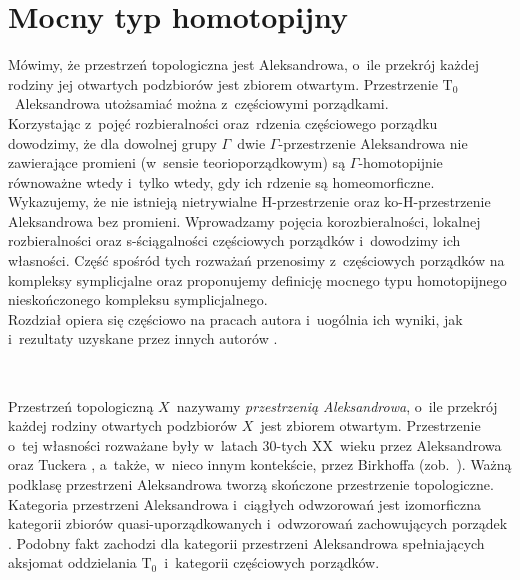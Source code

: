\chapter{Mocny typ homotopijny}\label{chapter2}
\begin{center}
\begin{minipage}{14cm}
{\small
Mówimy, że przestrzeń topologiczna jest Aleksandrowa, o~ile przekrój każdej rodziny jej otwartych podzbiorów jest zbiorem otwartym. Przestrzenie $\mathrm{T_0}$~Aleksandrowa utożsamiać można z~częściowymi porządkami. \\

Korzystając z~pojęć rozbieralności oraz~rdzenia częściowego porządku dowodzimy, że dla dowolnej grupy $\Gamma$~dwie $\Gamma$-przestrzenie Aleksandrowa nie zawierające promieni (w~sensie teorioporządkowym) są $\Gamma$-homotopijnie równoważne wtedy i~tylko wtedy, gdy ich rdzenie są homeomorficzne.  Wykazujemy, że  nie istnieją nietrywialne H-przestrzenie oraz ko-H-przestrzenie Aleksandrowa bez promieni. Wprowadzamy pojęcia korozbieralności, lokalnej rozbieralności oraz s-ściągalności częściowych porządków i~dowodzimy ich własności. Część spośród tych rozważań przenosimy z~częściowych porządków na kompleksy symplicjalne oraz proponujemy definicję mocnego typu homotopijnego nieskończonego kompleksu symplicjalnego.\\

Rozdział opiera się częściowo na pracach autora \cite{Kukiela10a,Kukiela10} i~uogólnia ich wyniki, jak i~rezultaty uzyskane przez innych autorów \cite{Barmak12,Stong66,Stong84}.
}\end{minipage}\\[1.7cm]
\end{center}

Przestrzeń topologiczną $X$~nazywamy \textit{przestrzenią Aleksandrowa}, o~ile przekrój każdej rodziny otwartych podzbiorów $X$~jest zbiorem otwartym. Przestrzenie o~tej własności rozważane były w~latach 30-tych XX~wieku przez Aleksandrowa \cite{Alexandroff37} oraz Tuckera \cite{Tucker36}, a~także, w~nieco innym kontekście, przez Birkhoffa (zob.~\cite{Ronse}). Ważną podklasę przestrzeni Aleksandrowa tworzą skończone przestrzenie topologiczne. Kategoria przestrzeni Aleksandrowa i~ciągłych odwzorowań jest izomorficzna kategorii zbiorów quasi-uporządkowanych i~odwzorowań zachowujących porządek \cite{Alexandroff37,Tucker36}. Podobny fakt zachodzi dla kategorii przestrzeni Aleksandrowa spełniających aksjomat oddzielania $\mathrm{T_0}$~i~kategorii częściowych porządków.

